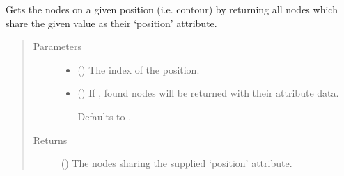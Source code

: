 \documentclass[letterpaper,10pt,english]{sphinxmanual}
\begin{document}
\begin{fulllineitems}

\begin{fulllineitems}
\label{\detokenize{cockatoo:cockatoo.KnitNetworkBase.nodes_on_position}}
Gets the nodes on a given position (i.e. contour) by returning all
nodes which share the given value as their ‘position’ attribute.
\begin{quote}\begin{description}
\item[{Parameters}] \leavevmode\begin{itemize}
\item {} 
 () \textendash{} The index of the position.

\item {} 
 (\sphinxstyleliteralemphasis{\sphinxupquote{, }}) \textendash{} 
If , found nodes will be returned with their attribute data.

Defaults to .


\end{itemize}

\item[{Returns}] \leavevmode
{} () \textendash{} The nodes sharing the supplied ‘position’ attribute.

\end{description}\end{quote}

\end{fulllineitems}



\end{fulllineitems}
\end{document}
